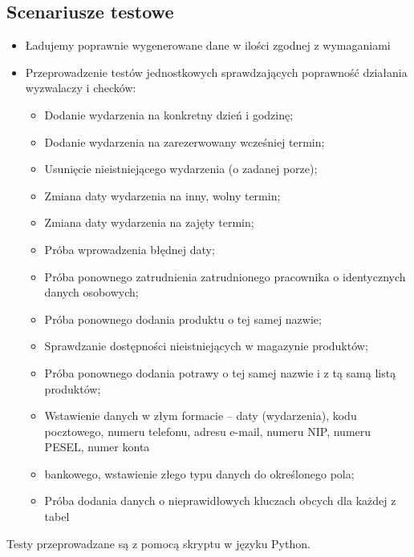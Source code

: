 \documentclass[10pt]{article}
\begin{document}

\subsection{Scenariusze testowe}
\begin{itemize}
    \item Ładujemy poprawnie wygenerowane dane w ilości zgodnej z wymaganiami
    \item Przeprowadzenie testów jednostkowych sprawdzających poprawność działania wyzwalaczy i checków:
        \begin{itemize}
            \item Dodanie wydarzenia na konkretny dzień i godzinę;
            \item Dodanie wydarzenia na zarezerwowany wcześniej termin;
            \item Usunięcie nieistniejącego wydarzenia (o zadanej porze);
            \item Zmiana daty wydarzenia na inny, wolny termin;
            \item Zmiana daty wydarzenia na zajęty termin;
            \item Próba wprowadzenia błędnej daty;
            \item Próba ponownego zatrudnienia zatrudnionego pracownika o identycznych danych osobowych;
            \item Próba ponownego dodania produktu o tej samej nazwie;
            \item Sprawdzanie dostępności nieistniejących w magazynie produktów;
            \item Próba ponownego dodania potrawy o tej samej nazwie i z tą samą listą produktów;
            \item Wstawienie danych w złym formacie – daty (wydarzenia), kodu pocztowego, numeru telefonu, adresu e-mail, numeru NIP, numeru PESEL, numer konta\item bankowego, wstawienie złego typu danych do określonego pola;
            \item Próba dodania danych o nieprawidłowych kluczach obcych dla każdej z tabel
        \end{itemize}
\end{itemize}
 
Testy przeprowadzane są z pomocą skryptu w języku Python.
\end{document}
